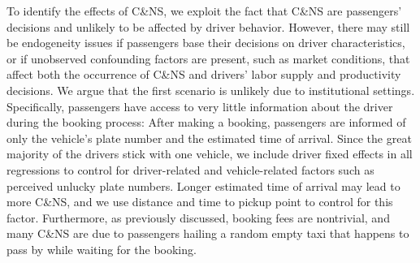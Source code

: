 \documentclass[reviewmode]{restat}
\begin{document}
To identify the effects of C\&NS, we exploit the fact that C\&NS are passengers' decisions and unlikely to be
affected by driver behavior. However, there may still be endogeneity issues if passengers base their decisions 
on driver characteristics, or if unobserved confounding factors are present, such as market conditions,
that affect both the occurrence of C\&NS and drivers' labor supply and productivity decisions. 
We argue that the first scenario is unlikely due to institutional settings. Specifically, passengers have 
access to very little information about the driver during the booking process: After making a booking, 
passengers are informed of only the vehicle's plate number and the estimated time of arrival. 
Since the great majority of the drivers stick with one vehicle, we include driver fixed effects in all
regressions to control for driver-related and vehicle-related factors such as perceived unlucky plate numbers.
Longer estimated time of arrival may lead to more C\&NS, and we use distance and time to pickup point to 
control for this factor. 
Furthermore, as previously discussed, booking fees are nontrivial, and many C\&NS are due to passengers
hailing a random empty taxi that happens to pass by while waiting for the booking. 
\end{document}
